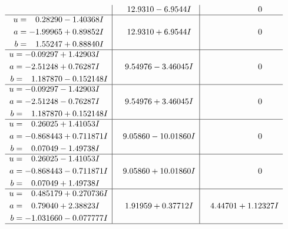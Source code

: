 \documentclass[1p]{elsarticle_modified}
\theoremstyle{definition}
\begin{document}
$$\begin{array}{c|c|c}
 & \phantom{-}12.9310 - 6.9544 I & \phantom{-0.000000 } 0 \\ \hline\begin{aligned}
u &= \phantom{-}0.28290 - 1.40368 I \\
a &= -1.99965 + 0.89852 I \\
b &= \phantom{-}1.55247 + 0.88840 I\end{aligned}
 & \phantom{-}12.9310 + 6.9544 I & \phantom{-0.000000 } 0 \\ \hline\begin{aligned}
u &= -0.09297 + 1.42903 I \\
a &= -2.51248 + 0.76287 I \\
b &= \phantom{-}1.187870 - 0.152148 I\end{aligned}
 & \phantom{-}9.54976 - 3.46045 I & \phantom{-0.000000 } 0 \\ \hline\begin{aligned}
u &= -0.09297 - 1.42903 I \\
a &= -2.51248 - 0.76287 I \\
b &= \phantom{-}1.187870 + 0.152148 I\end{aligned}
 & \phantom{-}9.54976 + 3.46045 I & \phantom{-0.000000 } 0 \\ \hline\begin{aligned}
u &= \phantom{-}0.26025 + 1.41053 I \\
a &= -0.868443 + 0.711871 I \\
b &= \phantom{-}0.07049 - 1.49738 I\end{aligned}
 & \phantom{-}9.05860 - 10.01860 I & \phantom{-0.000000 } 0 \\ \hline\begin{aligned}
u &= \phantom{-}0.26025 - 1.41053 I \\
a &= -0.868443 - 0.711871 I \\
b &= \phantom{-}0.07049 + 1.49738 I\end{aligned}
 & \phantom{-}9.05860 + 10.01860 I & \phantom{-0.000000 } 0 \\ \hline\begin{aligned}
u &= \phantom{-}0.485179 + 0.270736 I \\
a &= \phantom{-}0.79040 + 2.38823 I \\
b &= -1.031660 - 0.077777 I\end{aligned}
 & \phantom{-}1.91959 + 0.37712 I & \phantom{-}4.44701 + 1.12327 I\\
 \hline 
 \end{array}$$\newpage$$\begin{array}{c|c|c}  

\end{array}$$
\end{document}
